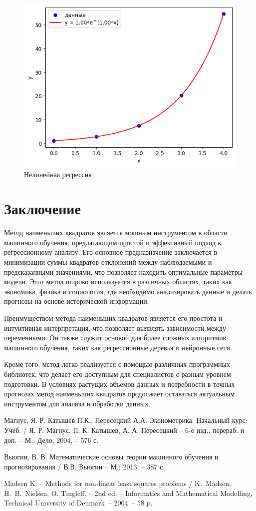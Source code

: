 \documentclass[11pt,a4paper]{article}
\begin{document}
\begin{figure}[H]
    \centering
    \includegraphics[width=0.75\linewidth]{gauss-newton-example.png}
    \caption{Нелинейная регрессия}
    \label{fig:fig2}
\end{figure}


\section*{Заключение}

Метод наименьших квадратов является мощным инструментом в области машинного обучения, предлагающим простой и эффективный подход к регрессионному анализу. Его основное предназначение заключается в минимизации суммы квадратов отклонений между наблюдаемыми и предсказанными значениями, что позволяет находить оптимальные параметры модели. Этот метод широко используется в различных областях, таких как экономика, физика и социология, где необходимо анализировать данные и делать прогнозы на основе исторической информации.

Преимуществом метода наименьших квадратов является его простота и интуитивная интерпретация, что позволяет выявлять зависимости между переменными. Он также служит основой для более сложных алгоритмов машинного обучения, таких как регрессионные деревья и нейронные сети.

Кроме того, метод легко реализуется с помощью различных программных библиотек, что делает его доступным для специалистов с разным уровнем подготовки. В условиях растущих объемов данных и потребности в точных прогнозах метод наименьших квадратов продолжает оставаться актуальным инструментом для анализа и обработки данных.


\begin{thebibliography}{9}
Магнус, Я. Р. Катышев П.К., Пересецкий А.А. Эконометрика. Начальный курс: Учеб. / Я. Р. Магнус, П. К. Катышев, А. А. Пересецкий -- 6-е изд., перераб. и доп. -- М.: Дело, 2004. -- 576 с.

Вьюгин, В. В. Математические основы теории машинного обучения и прогнозирования / В.В. Вьюгин -- М.: 2013. -- 387 с.

Madsen K. -- Methods for non-linear least squares problems / K.~Madsen, H.~B.~Nielsen, O. Tingleff. -- 2nd ed. -- Informatics and Mathematical Modelling, Technical University of Denmark~-- 2004~-- 58 p.
\end{thebibliography}
\end{document}
